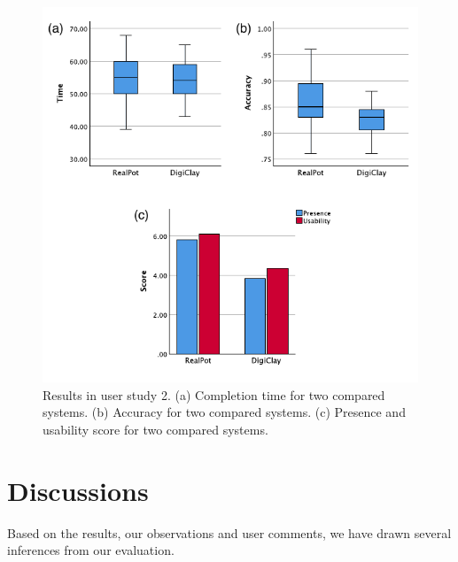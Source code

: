 \documentclass{svjour3}                     %
\begin{document}
\begin{figure}
	\includegraphics[width=\textwidth]{fig14}
	\caption{Results in user study 2. (a) Completion time for two compared systems. (b) Accuracy for two compared systems. (c) Presence and usability score for two compared systems.}
	\label{fig:r2}
\end{figure}




\section{Discussions}
\label{sec:discussion}

Based on the results, our observations and user comments, we have drawn several inferences from our evaluation.
\end{document}
